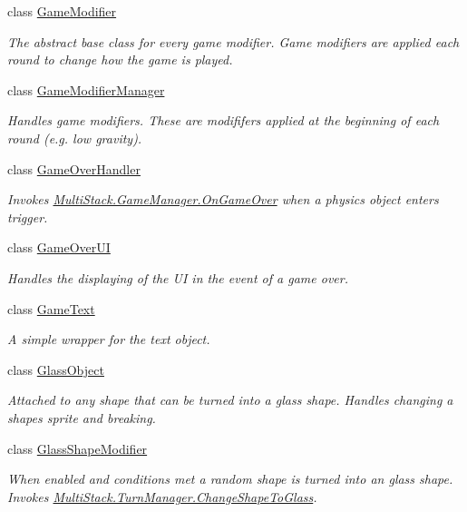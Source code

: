\begin{DoxyCompactItemize}
class \hyperlink{class_multi_stack_1_1_game_modifier}{Game\+Modifier}
\begin{DoxyCompactList}\small\item\em The abstract base class for every game modifier. Game modifiers are applied each round to change how the game is played. \end{DoxyCompactList}\item 
class \hyperlink{class_multi_stack_1_1_game_modifier_manager}{Game\+Modifier\+Manager}
\begin{DoxyCompactList}\small\item\em Handles game modifiers. These are modififers applied at the beginning of each round (e.\+g. low gravity). \end{DoxyCompactList}\item 
class \hyperlink{class_multi_stack_1_1_game_over_handler}{Game\+Over\+Handler}
\begin{DoxyCompactList}\small\item\em Invokes \hyperlink{class_multi_stack_1_1_game_manager_a8c599ec14abfba5712e9631a00d4ec59}{Multi\+Stack.\+Game\+Manager.\+On\+Game\+Over} when a physics object enters trigger. \end{DoxyCompactList}\item 
class \hyperlink{class_multi_stack_1_1_game_over_u_i}{Game\+Over\+U\+I}
\begin{DoxyCompactList}\small\item\em Handles the displaying of the U\+I in the event of a game over. \end{DoxyCompactList}\item 
class \hyperlink{class_multi_stack_1_1_game_text}{Game\+Text}
\begin{DoxyCompactList}\small\item\em A simple wrapper for the text object. \end{DoxyCompactList}\item 
class \hyperlink{class_multi_stack_1_1_glass_object}{Glass\+Object}
\begin{DoxyCompactList}\small\item\em Attached to any shape that can be turned into a glass shape. Handles changing a shapes sprite and breaking. \end{DoxyCompactList}\item 
class \hyperlink{class_multi_stack_1_1_glass_shape_modifier}{Glass\+Shape\+Modifier}
\begin{DoxyCompactList}\small\item\em When enabled and conditions met a random shape is turned into an glass shape. Invokes \hyperlink{class_multi_stack_1_1_turn_manager_a5ecde21a2b9c4d25fa781e717a946700}{Multi\+Stack.\+Turn\+Manager.\+Change\+Shape\+To\+Glass}. \end{DoxyCompactList}\item 

\end{DoxyCompactItemize}
